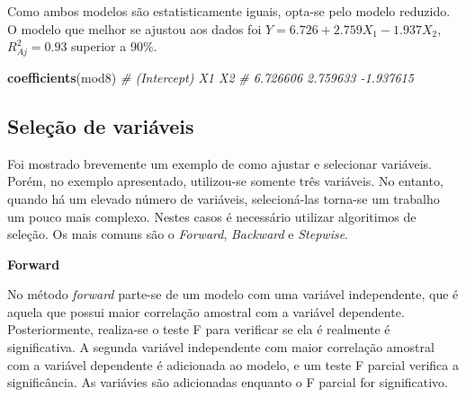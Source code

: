 \documentclass[
]{book}
\newenvironment{Shaded}{\begin{snugshade}}{\end{snugshade}}
\newcommand{\CommentTok}[1]{\textcolor[rgb]{0.56,0.35,0.01}{\textit{#1}}}
\newcommand{\KeywordTok}[1]{\textcolor[rgb]{0.13,0.29,0.53}{\textbf{#1}}}
\newcommand{\NormalTok}[1]{#1}
\begin{document}
Como ambos modelos são estatisticamente iguais, opta-se pelo modelo reduzido. O modelo que melhor se ajustou aos dados foi \(Y = 6.726 + 2.759X_1 - 1.937X_2\), \(R^2_{Aj} = 0.93\) superior a 90\%.

\begin{Shaded}
\begin{Highlighting}[]
\KeywordTok{coefficients}\NormalTok{(mod8)}
\CommentTok{# (Intercept)          X1          X2 }
\CommentTok{#    6.726606    2.759633   -1.937615}
\end{Highlighting}
\end{Shaded}

\hypertarget{seleuxe7uxe3o-de-variuxe1veis}{%
\subsection{Seleção de variáveis}\label{seleuxe7uxe3o-de-variuxe1veis}}

Foi mostrado brevemente um exemplo de como ajustar e selecionar variáveis. Porém, no exemplo apresentado, utilizou-se somente três variáveis. No entanto, quando há um elevado número de variáveis, selecioná-las torna-se um trabalho um pouco mais complexo. Nestes casos é necessário utilizar algoritimos de seleção. Os mais comuns são o \emph{Forward}, \emph{Backward} e \emph{Stepwise}.

\textbf{Forward} 

No método \emph{forward} parte-se de um modelo com uma variável independente, que é aquela que possui maior correlação  amostral com a variável dependente. Posteriormente, realiza-se o teste F para verificar se ela é realmente é significativa. A segunda variável independente com maior correlação amostral com a variável dependente é adicionada ao modelo, e um teste F parcial verifica a significância. As variávies são adicionadas enquanto o F parcial for significativo.
\end{document}
